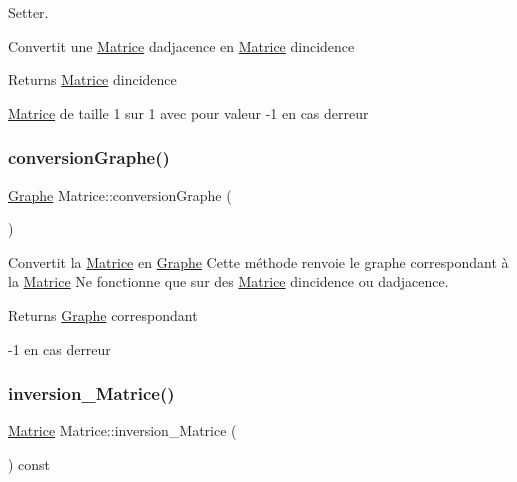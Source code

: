 Setter. 

Convertit une \hyperlink{classMatrice}{Matrice} d\textquotesingle{}adjacence en \hyperlink{classMatrice}{Matrice} d\textquotesingle{}incidence \begin{DoxyReturn}{Returns}
\hyperlink{classMatrice}{Matrice} d\textquotesingle{}incidence 

\hyperlink{classMatrice}{Matrice} de taille 1 sur 1 avec pour valeur -\/1 en cas d\textquotesingle{}erreur 
\end{DoxyReturn}
\mbox{\label{classMatrice_a3b6cb901a40c673c9f78c11bfd12892d}} 
\subsubsection{\texorpdfstring{conversion\+Graphe()}{conversionGraphe()}}
{\footnotesize\ttfamily \hyperlink{classGraphe}{Graphe} Matrice\+::conversion\+Graphe (\begin{DoxyParamCaption}{ }\end{DoxyParamCaption})}



Convertit la \hyperlink{classMatrice}{Matrice} en \hyperlink{classGraphe}{Graphe} Cette m\'{e}thode renvoie le graphe correspondant \`{a} la \hyperlink{classMatrice}{Matrice} Ne fonctionne que sur des \hyperlink{classMatrice}{Matrice} d\textquotesingle{}incidence ou d\textquotesingle{}adjacence. 

\begin{DoxyReturn}{Returns}
\hyperlink{classGraphe}{Graphe} correspondant 

-\/1 en cas d\textquotesingle{}erreur 
\end{DoxyReturn}
\mbox{\label{classMatrice_a5f25a7bf06c46b69c24e82d3af3c697f}} 
\subsubsection{\texorpdfstring{inversion\+\_\+\+Matrice()}{inversion\_Matrice()}}
{\footnotesize\ttfamily \hyperlink{classMatrice}{Matrice} Matrice\+::inversion\+\_\+\+Matrice (\begin{DoxyParamCaption}{ }\end{DoxyParamCaption}) const}



